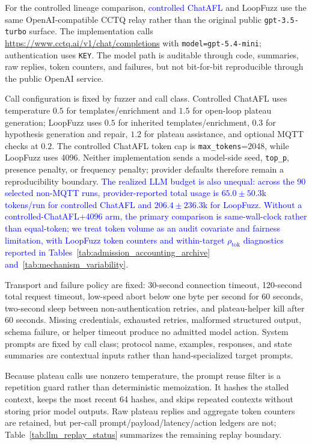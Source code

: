 \documentclass[final,5p,times,number]{elsarticle}
\begin{document}
For the controlled lineage comparison, \textcolor{blue}{controlled ChatAFL} and LoopFuzz use the same OpenAI-compatible CCTQ relay rather than the original public \texttt{gpt-3.5-turbo} surface. The implementation calls \url{https://www.cctq.ai/v1/chat/completions} with \texttt{model=gpt-5.4-mini}; authentication uses \texttt{KEY}. The model path is auditable through code, summaries, raw replies, token counters, and failures, but not bit-for-bit reproducible through the public OpenAI service.

Call configuration is fixed by fuzzer and call class. Controlled ChatAFL uses temperature $0.5$ for templates/enrichment and $1.5$ for open-loop plateau generation; LoopFuzz uses $0.5$ for inherited templates/enrichment, $0.3$ for hypothesis generation and repair, $1.2$ for plateau assistance, and optional MQTT checks at $0.2$. The controlled ChatAFL token cap is \texttt{max\_tokens}=2048, while LoopFuzz uses 4096. Neither implementation sends a model-side seed, \texttt{top\_p}, presence penalty, or frequency penalty; provider defaults therefore remain a reproducibility boundary.
\textcolor{blue}{The realized LLM budget is also unequal: across the 90 selected non-MQTT runs, provider-reported total usage is $65.0{\pm}50.3$k tokens/run for controlled ChatAFL and $206.4{\pm}236.3$k for LoopFuzz. Without a controlled-ChatAFL+4096 arm, the primary comparison is same-wall-clock rather than equal-token; we treat token volume as an audit covariate and fairness limitation, with LoopFuzz token counters and within-target $\rho_{\mathrm{tok}}$ diagnostics reported in Tables~\ref{tab:admission_accounting_archive} and~\ref{tab:mechanism_variability}.}

Transport and failure policy are fixed: 30-second connection timeout, 120-second total request timeout, low-speed abort below one byte per second for 60 seconds, two-second sleep between non-authentication retries, and plateau-helper kill after 60 seconds. Missing credentials, exhausted retries, malformed structured output, schema failure, or helper timeout produce no admitted model action. System prompts are fixed by call class; protocol name, examples, responses, and state summaries are contextual inputs rather than hand-specialized target prompts.

Because plateau calls use nonzero temperature, the prompt reuse filter is a repetition guard rather than deterministic memoization. It hashes the stalled context, keeps the most recent 64 hashes, and skips repeated contexts without storing prior model outputs. Raw plateau replies and aggregate token counters are retained, but per-call prompt/payload/latency/action ledgers are not; Table~\ref{tab:llm_replay_status} summarizes the remaining replay boundary.
\end{document}
